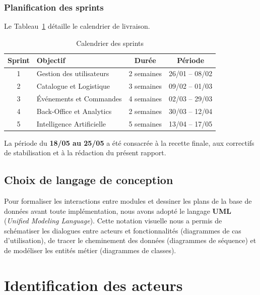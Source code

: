 \subsubsection{Planification des sprints}

Le Tableau~\ref{tab:planification_sprints} détaille le calendrier de livraison.

\begin{table}[H]
    \centering
    \caption{Calendrier des sprints}
    \label{tab:planification_sprints}
    \renewcommand{\arraystretch}{1.3}
    \begin{tabular}{|c|p{5.5cm}|c|c|}
        \hline
        \textbf{Sprint} & \textbf{Objectif} & \textbf{Durée} & \textbf{Période} \\
        \hline
        1 & Gestion des utilisateurs & 2 semaines & 26/01 -- 08/02 \\
        \hline
        2 & Catalogue et Logistique & 3 semaines & 09/02 -- 01/03 \\
        \hline
        3 & Événements et Commandes & 4 semaines & 02/03 -- 29/03 \\
        \hline
        4 & Back-Office et Analytics & 2 semaines & 30/03 -- 12/04 \\
        \hline
        5 & Intelligence Artificielle & 5 semaines & 13/04 -- 17/05 \\
        \hline
    \end{tabular}
\end{table}

La période du \textbf{18/05 au 25/05} a été consacrée à la recette finale, aux correctifs de stabilisation et à la rédaction du présent rapport.

\subsection{Choix de langage de conception}

Pour formaliser les interactions entre modules et dessiner les plans de la base de données avant toute implémentation, nous avons adopté le langage \textbf{UML} (\textit{Unified Modeling Language}). Cette notation visuelle nous a permis de schématiser les dialogues entre acteurs et fonctionnalités (diagrammes de cas d'utilisation), de tracer le cheminement des données (diagrammes de séquence) et de modéliser les entités métier (diagrammes de classes).

\section{Identification des acteurs}

